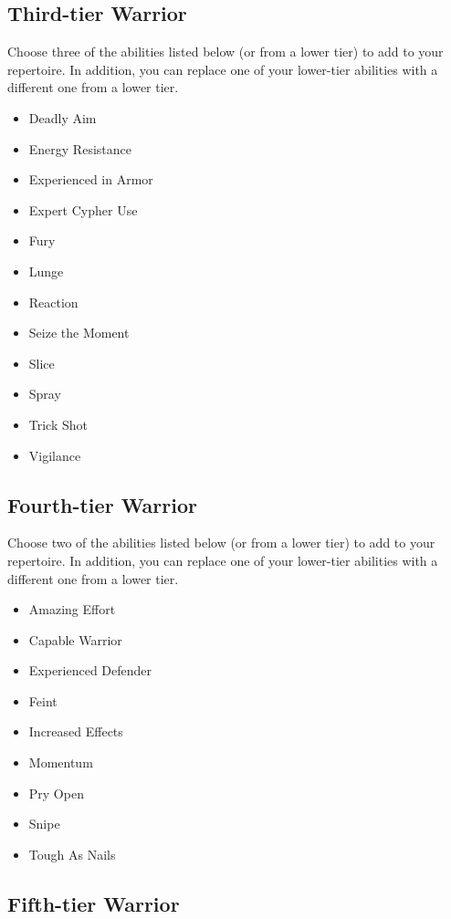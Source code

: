 \begin{multicols}{2}
\subsection{Third-tier Warrior}

Choose three of the abilities listed below (or from a lower tier) to add to your repertoire. In addition, you can replace one of your lower-tier abilities with a different one from a lower tier.

\begin{itemize}
\item Deadly Aim
\item Energy Resistance
\item Experienced in Armor
\item Expert Cypher Use
\item Fury
\item Lunge
\item Reaction
\item Seize the Moment
\item Slice
\item Spray
\item Trick Shot
\item Vigilance
\end{itemize}

\subsection{Fourth-tier Warrior}

Choose two of the abilities listed below (or from a lower tier) to add to your repertoire. In addition, you can replace one of your lower-tier abilities with a different one from a lower tier.

\begin{itemize}
\item Amazing Effort
\item Capable Warrior
\item Experienced Defender
\item Feint
\item Increased Effects
\item Momentum
\item Pry Open
\item Snipe
\item Tough As Nails
\end{itemize}

\subsection{Fifth-tier Warrior}


\end{multicols}
